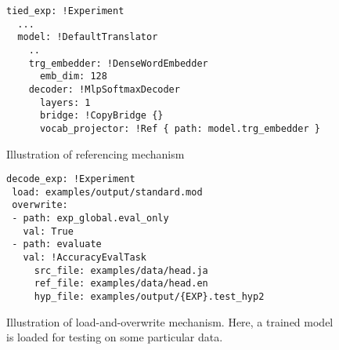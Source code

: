 \documentclass[]{article}
\newcommand{\gn}[1]{\textcolor{cyan}{\bf\small [#1 --GN]}}
\begin{document}


\begin{figure}[tb]
\centering
  \begin{verbatim}
tied_exp: !Experiment
  ...
  model: !DefaultTranslator
    ..
    trg_embedder: !DenseWordEmbedder
      emb_dim: 128
    decoder: !MlpSoftmaxDecoder
      layers: 1
      bridge: !CopyBridge {}
      vocab_projector: !Ref { path: model.trg_embedder }
\end{verbatim}
\vspace{-6mm}
\caption{Illustration of referencing mechanism \label{yaml_example_2}}
\end{figure}


\begin{figure}[tb]
\centering
  \begin{verbatim}
decode_exp: !Experiment
 load: examples/output/standard.mod
 overwrite:
 - path: exp_global.eval_only
   val: True
 - path: evaluate
   val: !AccuracyEvalTask
     src_file: examples/data/head.ja
     ref_file: examples/data/head.en
     hyp_file: examples/output/{EXP}.test_hyp2
\end{verbatim}
\vspace{-6mm}
\caption{Illustration of load-and-overwrite mechanism. Here, a trained model is loaded for testing on some particular data. \label{yaml_example_3}}
\end{figure}
\end{document}
